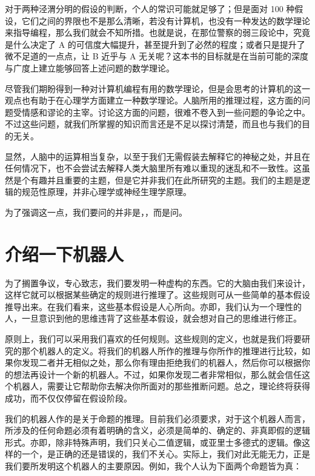 对于两种泾渭分明的假设的判断，个人的常识可能就足够了；但是面对 100 种假设，它们之间的界限也不是那么清晰，若没有计算机，也没有一种发达的数学理论来指导编程，那么我们就会不知所措。也就是说，在那位警察的弱三段论中，究竟是什么决定了 A 的可信度大幅提升，甚至提升到了必然的程度；或者只是提升了微不足道的一点点，让 B 近乎与 A 无关呢？这本书的目标就是在当前可能的深度与广度上建立能够回答上述问题的数学理论。

尽管我们期盼得到一种对计算机编程有用的数学理论，但是会思考的计算机的这一观点也有助于在心理学方面建立一种数学理论。人脑所用的推理过程，这方面的问题受情感和谬论的主宰。讨论这方面的问题，很难不卷入到一些问题的争论之中。不过这些问题，就我们所掌握的知识而言还是不足以探讨清楚，而且也与我们的目的无关。

显然，人脑中的运算相当复杂，以至于我们无需假装去解释它的神秘之处，并且在任何情况下，也不会尝试去解释人类大脑里所有难以重现的迷乱和不一致性。这虽然是个有趣并且重要的主题，但是它并非我们在此所研究的主题。我们的主题是逻辑的规范性原理，并非心理学或神经生理学原理。

为了强调这一点，我们要问的并非是，，而是问。

\section{介绍一下机器人}

为了搁置争议，专心致志，我们要发明一种虚构的东西。它的大脑由我们来设计，这样它就可以根据某些确定的规则进行推理了。这些规则可从一些简单的基本假设推导出来。在我们看来，这些基本假设是人心所向。亦即，我们认为一个理性的人，一旦意识到他的思维违背了这些基本假设，就会想对自己的思维进行修正。

原则上，我们可以采用我们喜欢的任何规则。这些规则的定义，也就是我们将要研究的那个机器人的定义。将我们的机器人所作的推理与你所作的推理进行比较，如果你发现二者并无相似之处，那么你有理由拒绝我们的机器人，然后你可以根据你的想法再设计一个新的机器人。不过，如果你发现二者非常相似，那么就会信任这个机器人，需要让它帮助你去解决你所面对的那些推断问题。总之，理论终将获得成功，而不仅仅停留在假设阶段。

我们的机器人作的是关于命题的推理。目前我们必须要求，对于这个机器人而言，所涉及的任何命题必须有着明确的含义，必须是简单的、确定的、非真即假的逻辑形式。亦即，除非特殊声明，我们只关心二值逻辑，或亚里士多德式的逻辑。像这样的一个，是正确的还是错误的，我们不关心。实际上，我们对此无能无力，正是我们要所发明这个机器人的主要原因。例如，我个人认为下面两个命题皆为真：


